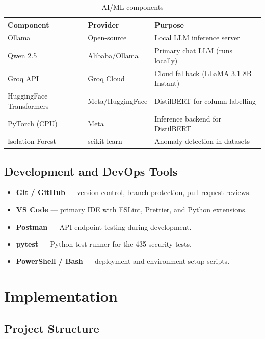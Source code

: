 \documentclass[12pt,a4paper]{report}
\begin{document}
\begin{table}[H]
\centering
\caption{AI/ML components}
\begin{tabularx}{\textwidth}{llX}
\toprule
\textbf{Component} & \textbf{Provider} & \textbf{Purpose} \\
\midrule
Ollama            & Open-source & Local LLM inference server \\
Qwen 2.5          & Alibaba/Ollama & Primary chat LLM (runs locally) \\
Groq API          & Groq Cloud & Cloud fallback (LLaMA 3.1 8B Instant) \\
HuggingFace Transformers & Meta/HuggingFace & DistilBERT for column labelling \\
PyTorch (CPU)     & Meta & Inference backend for DistilBERT \\
Isolation Forest  & scikit-learn & Anomaly detection in datasets \\
\bottomrule
\end{tabularx}
\end{table}

\section{Development and DevOps Tools}

\begin{itemize}[leftmargin=2em]
    \item \textbf{Git / GitHub} — version control, branch protection, pull request reviews.
    \item \textbf{VS Code} — primary IDE with ESLint, Prettier, and Python extensions.
    \item \textbf{Postman} — API endpoint testing during development.
    \item \textbf{pytest} — Python test runner for the 435 security tests.
    \item \textbf{PowerShell / Bash} — deployment and environment setup scripts.
\end{itemize}

\chapter{Implementation}

\section{Project Structure}
\end{document}
